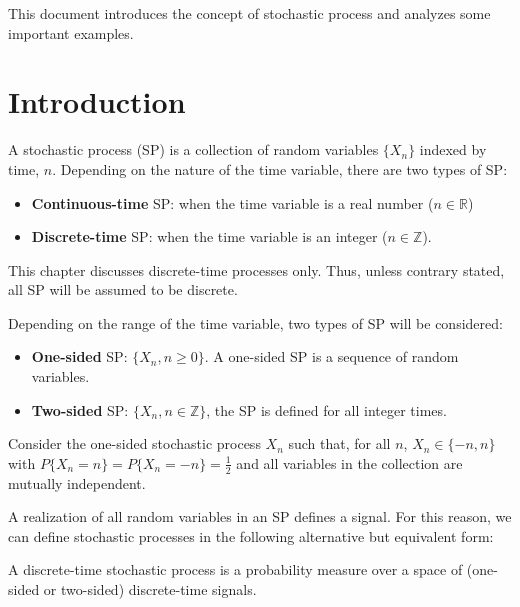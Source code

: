 

This document introduces the concept of stochastic process and analyzes some important examples.

\vspace{2cm}

\section{Introduction}

A stochastic process (SP) is a collection of random variables $\{X_n\}$ indexed by time, $n$. Depending on the nature of the time variable, there are two types of SP:
\begin{itemize}
\item \textbf{Continuous-time} SP: when the time variable is a real number ($n \in \mathbb{R}$)
\item \textbf{Discrete-time} SP: when the time variable is an integer ($n \in \mathbb{Z}$).
\end{itemize}

This chapter discusses discrete-time processes only. Thus, unless contrary stated, all SP will be assumed to be discrete.

Depending on the range of the time variable, two types of SP will be considered:
\begin{itemize}
\item \textbf{One-sided} SP: $\{X_n, n \ge 0\}$. A one-sided SP is a sequence of random variables.
\item \textbf{Two-sided} SP: $\{X_n, n\in \mathbb{Z}\}$, the SP is defined for all integer times.
\end{itemize}

\begin{example}

Consider the one-sided stochastic process $X_n$ such that, for all $n$, $X_n \in \{-n, n\}$ with $P\{X_n=n\}=P\{X_n=-n\}=\frac12$ and all variables in the collection are mutually independent.

\end{example}

A realization of all random variables in an SP defines a signal. For this reason, we can define stochastic processes in the following alternative but equivalent form:

\begin{definition}

A discrete-time stochastic process is a probability measure over a space of (one-sided or two-sided) discrete-time signals.

\end{definition}

